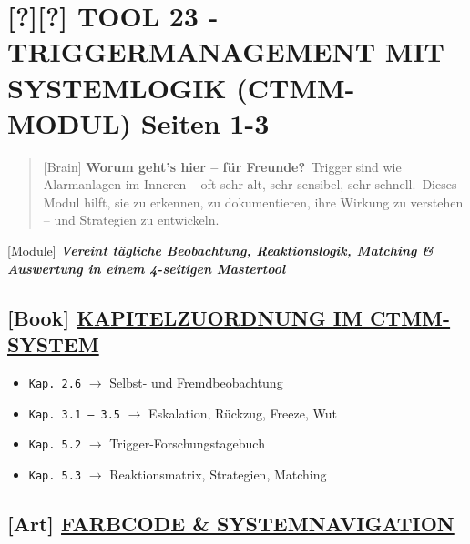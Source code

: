 \hypertarget{tool-23---triggermanagement-mit-systemlogik-ctmm-modul-seiten-1-3}{%
\section{\texorpdfstring{[?][?] \textbf{TOOL 23 - TRIGGERMANAGEMENT MIT SYSTEMLOGIK (CTMM-MODUL) Seiten 1-3}}{[?][?] TOOL 23 - TRIGGERMANAGEMENT MIT SYSTEMLOGIK (CTMM-MODUL) Seiten 1-3}}\label{tool-23---triggermanagement-mit-systemlogik-ctmm-modul-seiten-1-3}}

\begin{quote}
[Brain] \textbf{Worum geht's hier -- für Freunde?}\
Trigger sind wie Alarmanlagen im Inneren -- oft sehr alt, sehr sensibel, sehr schnell.\
Dieses Modul hilft, sie zu erkennen, zu dokumentieren, ihre Wirkung zu verstehen -- und Strategien zu entwickeln.
\end{quote}

[Module] \emph{\textbf{Vereint tägliche Beobachtung, Reaktionslogik, Matching \& Auswertung in einem 4-seitigen Mastertool}}

\hypertarget{kapitelzuordnung-im-ctmm-system}{%
\subsection{\texorpdfstring{[Book] \textbf{\ul{KAPITELZUORDNUNG IM CTMM-SYSTEM}}}{[Book] KAPITELZUORDNUNG IM CTMM-SYSTEM}}\label{kapitelzuordnung-im-ctmm-system}}

\begin{itemize}
\tightlist
\item
  \texttt{Kap.\ }\texttt{2.6} $\rightarrow$ Selbst- und Fremdbeobachtung
\item
  \texttt{Kap.\ }\texttt{3.1\ --\ 3.5} $\rightarrow$ Eskalation, Rückzug, Freeze, Wut
\item
  \texttt{Kap.\ }\texttt{5.2} $\rightarrow$ Trigger-Forschungstagebuch
\item
  \texttt{Kap.\ }\texttt{5.3} $\rightarrow$ Reaktionsmatrix, Strategien, Matching
\end{itemize}

\hypertarget{farbcode-systemnavigation}{%
\subsection{\texorpdfstring{[Art] \textbf{\ul{FARBCODE \& SYSTEMNAVIGATION}}}{[Art] FARBCODE \& SYSTEMNAVIGATION}}\label{farbcode-systemnavigation}}

